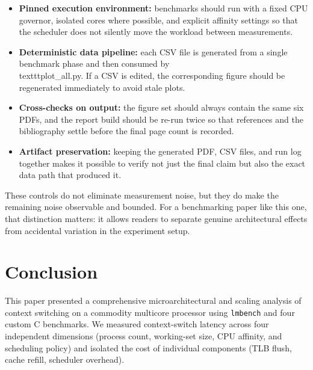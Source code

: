 \documentclass[conference]{IEEEtran}
\begin{document}
\begin{itemize}
  \item \textbf{Pinned execution environment:} benchmarks should run with a fixed CPU
        governor, isolated cores where possible, and explicit affinity settings so that
        the scheduler does not silently move the workload between measurements.

  \item \textbf{Deterministic data pipeline:} each CSV file is generated from a single
        benchmark phase and then consumed by \\texttt{plot\_all.py}.  If a CSV is edited,
        the corresponding figure should be regenerated immediately to avoid stale plots.

  \item \textbf{Cross-checks on output:} the figure set should always contain the same
        six PDFs, and the report build should be re-run twice so that references and the
        bibliography settle before the final page count is recorded.

  \item \textbf{Artifact preservation:} keeping the generated PDF, CSV files, and run log
        together makes it possible to verify not just the final claim but also the exact
        data path that produced it.
\end{itemize}

These controls do not eliminate measurement noise, but they do make the remaining noise
observable and bounded.  For a benchmarking paper like this one, that distinction matters:
it allows readers to separate genuine architectural effects from accidental variation in
the experiment setup.

\section{Conclusion}
\label{sec:conclusion}

This paper presented a comprehensive microarchitectural and scaling
analysis of context switching on a commodity multicore processor using
\texttt{lmbench} and four custom C benchmarks.  We measured context-switch
latency across four independent dimensions (process count, working-set size,
CPU affinity, and scheduling policy) and isolated the cost of individual components
(TLB flush, cache refill, scheduler overhead).
\end{document}
